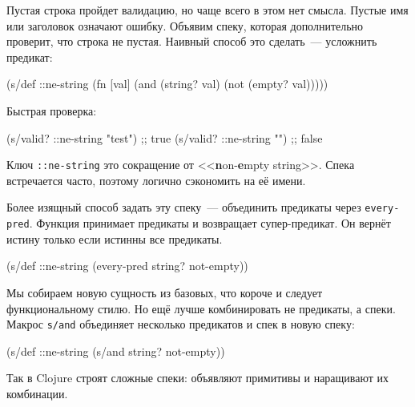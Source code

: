Пустая строка пройдет валидацию, но чаще всего в этом нет смысла. Пустые имя или
заголовок означают ошибку. Объявим спеку, которая дополнительно проверит, что
строка не пустая. Наивный способ это сделать~--- усложнить предикат:


\begin{english}
  \begin{clojure}
(s/def ::ne-string
  (fn [val]
    (and (string? val)
         (not (empty? val)))))
  \end{clojure}
\end{english}

\noindent
Быстрая проверка:

\begin{english}
  \begin{clojure}
(s/valid? ::ne-string "test") ;; true
(s/valid? ::ne-string "")     ;; false
  \end{clojure}
\end{english}

Ключ \verb|::ne-string| это сокращение от <<\textbf{n}on-\textbf{e}mpty
string>>. Спека встречается часто, поэтому логично сэкономить на её имени.

Более изящный способ задать эту спеку~--- объединить предикаты через
\verb|every-pred|. Функция принимает предикаты и возвращает супер-предикат. Он
вернёт истину только если истинны все предикаты.

\begin{english}
  \begin{clojure}
(s/def ::ne-string
  (every-pred string? not-empty))
  \end{clojure}
\end{english}


Мы собираем новую сущность из базовых, что короче и следует функциональному
стилю. Но ещё лучше комбинировать не предикаты, а спеки. Макрос \verb|s/and|
объединяет несколько предикатов и спек в новую спеку:

\begin{english}
  \begin{clojure}
(s/def ::ne-string
  (s/and string? not-empty))
  \end{clojure}
\end{english}

Так в Clojure строят сложные спеки: объявляют примитивы и наращивают их
комбинации.


